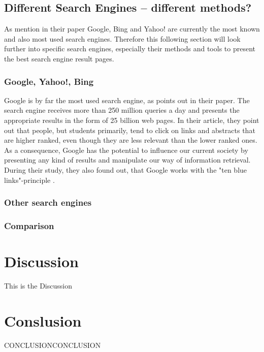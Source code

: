 \subsection{Different Search Engines -- different methods?}
\label{subsection:SearchEngine}
As \textcite{pan2007google, agrawal2015study} mention in their paper Google, Bing and Yahoo! are currently the most known and also most used search engines. Therefore this following section will look further into specific search engines, especially their methods and tools to present the best search engine result pages.

\subsubsection{Google, Yahoo!, Bing}
Google is by far the most used search engine, as \textcite{pan2007google} points out in their paper. The search engine receives more than 250 million queries a day and presents the appropriate results in the form of 25 billion web pages. In their article, they point out that people, but students primarily, tend to click on links and abstracts that are higher ranked, even though they are less relevant than the lower ranked ones. As a consequence, Google has the potential to influence our current society by presenting any kind of results and manipulate our way of information retrieval. During their study, they also found out, that Google works with the "ten blue links"-principle \autocite{pan2007google}.

\subsubsection{Other search engines}

\subsubsection{Comparison}

\section{Discussion}
\label{section:Discussion}
This is the Discussion

\section{Conslusion}
\label{section:Conclusion}
CONCLUSIONCONCLUSION



